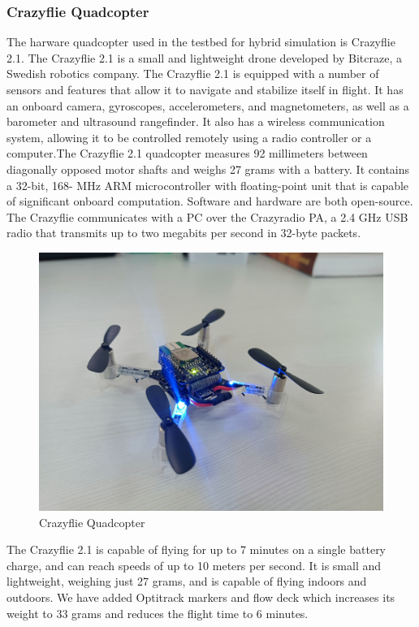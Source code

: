 \documentclass[letterpaper, 10 pt, conference]{ieeeconf}
\begin{document}
\subsubsection{Crazyflie Quadcopter}
The harware quadcopter used in the testbed for hybrid simulation is Crazyflie 2.1. The Crazyflie 2.1 is a small and lightweight drone developed by Bitcraze, a Swedish robotics company. The Crazyflie 2.1 is equipped with a number of sensors and features that allow it to navigate and stabilize itself in flight. It has an onboard camera, gyroscopes, accelerometers, and magnetometers, as well as a barometer and ultrasound rangefinder. It also has a wireless communication system, allowing it to be controlled remotely using a radio controller or a computer.The Crazyflie 2.1 quadcopter measures 92 millimeters between diagonally opposed motor shafts and weighs 27 grams with a battery. It contains a 32-bit, 168- MHz ARM microcontroller with floating-point unit that is capable of significant onboard computation. Software and hardware are both open-source. The Crazyflie communicates with a PC over the Crazyradio PA, a 2.4 GHz USB radio that transmits up to two megabits per second in 32-byte packets.
\begin{figure}[!ht]
    \centering
        \includegraphics[scale=0.06]{crazyflie.jpg} %
        \caption{Crazyflie Quadcopter}
        \label{Fig:crazyflie}
    \end{figure}
The Crazyflie 2.1 is capable of flying for up to 7 minutes on a single battery charge, and can reach speeds of up to 10 meters per second. It is small and lightweight, weighing just 27 grams, and is capable of flying indoors and outdoors. We have added Optitrack markers and flow deck which increases its weight to 33 grams and reduces the flight time to 6 minutes.\cite{crazyflie}
\end{document}
